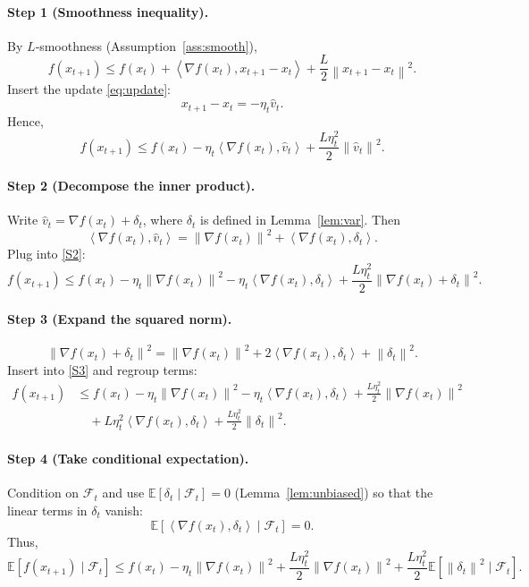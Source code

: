 \documentclass{article}
\newcommand{\E}{\mathbb{E}}
\newcommand{\norm}[1]{\left\|#1\right\|}
\newcommand{\ip}[2]{\left\langle #1,#2\right\rangle}
\newcommand{\grad}{\nabla}
\begin{document}
\paragraph{Step 1 (Smoothness inequality).}
By $L$‑smoothness (Assumption~\ref{ass:smooth}),
\begin{equation}
    f(x_{t+1})\le f(x_t)+\ip{\grad f(x_t)}{x_{t+1}-x_t}
        +\frac{L}{2}\norm{x_{t+1}-x_t}^2 .\tag{S1}
\end{equation}
Insert the update \eqref{eq:update}:
\[
    x_{t+1}-x_t = -\eta_t\hat v_t .
\]
Hence,
\begin{equation}
    f(x_{t+1})\le f(x_t)-\eta_t\ip{\grad f(x_t)}{\hat v_t}
        +\frac{L\eta_t^2}{2}\norm{\hat v_t}^2 .\tag{S2}
\end{equation}

\paragraph{Step 2 (Decompose the inner product).}
Write $\hat v_t = \grad f(x_t)+\delta_t$, where $\delta_t$ is defined in Lemma~\ref{lem:var}. Then
\[
    \ip{\grad f(x_t)}{\hat v_t}
    =\norm{\grad f(x_t)}^2+\ip{\grad f(x_t)}{\delta_t}.
\]
Plug into \eqref{S2}:
\begin{equation}
    f(x_{t+1})\le f(x_t)-\eta_t\norm{\grad f(x_t)}^2
        -\eta_t\ip{\grad f(x_t)}{\delta_t}
        +\frac{L\eta_t^2}{2}\norm{\grad f(x_t)+\delta_t}^2 .\tag{S3}
\end{equation}

\paragraph{Step 3 (Expand the squared norm).}
\[
    \norm{\grad f(x_t)+\delta_t}^2
    =\norm{\grad f(x_t)}^2+2\ip{\grad f(x_t)}{\delta_t}
      +\norm{\delta_t}^2 .
\]
Insert into \eqref{S3} and regroup terms:
\begin{align}
    f(x_{t+1}) &\le f(x_t)-\eta_t\norm{\grad f(x_t)}^2
        -\eta_t\ip{\grad f(x_t)}{\delta_t}
        +\frac{L\eta_t^2}{2}\norm{\grad f(x_t)}^2 \nonumber\\
    &\quad +L\eta_t^2\ip{\grad f(x_t)}{\delta_t}
        +\frac{L\eta_t^2}{2}\norm{\delta_t}^2 .\tag{S4}
\end{align}

\paragraph{Step 4 (Take conditional expectation).}
Condition on $\mathcal{F}_t$ and use $\E[\delta_t\mid\mathcal{F}_t]=0$ (Lemma~\ref{lem:unbiased}) so that the linear terms in $\delta_t$ vanish:
\[
    \E\!\left[\ip{\grad f(x_t)}{\delta_t}\mid\mathcal{F}_t\right]=0 .
\]
Thus,
\begin{equation}
    \E\!\left[f(x_{t+1})\mid\mathcal{F}_t\right]
    \le f(x_t)-\eta_t\norm{\grad f(x_t)}^2
        +\frac{L\eta_t^2}{2}\norm{\grad f(x_t)}^2
        +\frac{L\eta_t^2}{2}\E\!\left[\norm{\delta_t}^2\mid\mathcal{F}_t\right] .
    \tag{S5}
\end{equation}
\end{document}
